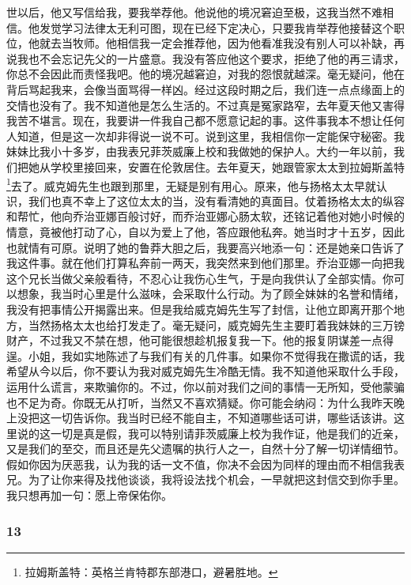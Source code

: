 {世以后，他又写信给我，要我举荐他。他说他的境况窘迫至极，这我当然不难相信。他发觉学习法律太无利可图，现在已经下定决心，只要我肯举荐他接替这个职位，他就去当牧师。他相信我一定会推荐他，因为他看准我没有别人可以补缺，再说我也不会忘记先父的一片盛意。我没有答应他这个要求，拒绝了他的再三请求，你总不会因此而责怪我吧。他的境况越窘迫，对我的怨恨就越深。毫无疑问，他在背后骂起我来，会像当面骂得一样凶。经过这段时期之后，我们连一点点缘面上的交情也没有了。我不知道他是怎么生活的。不过真是冤家路窄，去年夏天他又害得我苦不堪言。现在，我要讲一件我自己都不愿意记起的事。这件事我本不想让任何人知道，但是这一次却非得说一说不可。说到这里，我相信你一定能保守秘密。我妹妹比我小十多岁，由我表兄菲茨威廉上校和我做她的保护人。大约一年以前，我们把她从学校里接回来，安置在伦敦居住。去年夏天，她跟管家太太到拉姆斯盖特\footnote{拉姆斯盖特：英格兰肯特郡东部港口，避暑胜地。}去了。威克姆先生也跟到那里，无疑是别有用心。原来，他与扬格太太早就认识，我们也真不幸上了这位太太的当，没有看清她的真面目。仗着扬格太太的纵容和帮忙，他向乔治亚娜百般讨好，而乔治亚娜心肠太软，还铭记着他对她小时候的情意，竟被他打动了心，自以为爱上了他，答应跟他私奔。她当时才十五岁，因此也就情有可原。说明了她的鲁莽大胆之后，我要高兴地添一句：还是她亲口告诉了我这件事。就在他们打算私奔前一两天，我突然来到他们那里。乔治亚娜一向把我这个兄长当做父亲般看待，不忍心让我伤心生气，于是向我供认了全部实情。你可以想象，我当时心里是什么滋味，会采取什么行动。为了顾全妹妹的名誉和情绪，我没有把事情公开揭露出来。但是我给威克姆先生写了封信，让他立即离开那个地方，当然扬格太太也给打发走了。毫无疑问，威克姆先生主要盯着我妹妹的三万镑财产，不过我又不禁在想，他可能很想趁机报复我一下。他的报复阴谋差一点得逞。小姐，我如实地陈述了与我们有关的几件事。如果你不觉得我在撒谎的话，我希望从今以后，你不要认为我对威克姆先生冷酷无情。我不知道他采取什么手段，运用什么谎言，来欺骗你的。不过，你以前对我们之间的事情一无所知，受他蒙骗也不足为奇。你既无从打听，当然又不喜欢猜疑。你可能会纳闷：为什么我昨天晚上没把这一切告诉你。我当时已经不能自主，不知道哪些话可讲，哪些话该讲。这里说的这一切是真是假，我可以特别请菲茨威廉上校为我作证，他是我们的近亲，又是我们的至交，而且还是先父遗嘱的执行人之一，自然十分了解一切详情细节。假如你因为厌恶我，认为我的话一文不值，你决不会因为同样的理由而不相信我表兄。为了让你来得及找他谈谈，我将设法找个机会，一早就把这封信交到你手里。我只想再加一句：愿上帝保佑你。
    \par {}
}




\subsubsection*{13}


